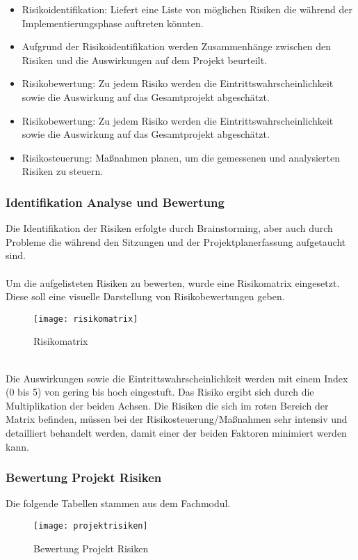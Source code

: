 \begin{itemize}
	\item Risikoidentifikation: Liefert eine Liste von möglichen Risiken die während der Implementierungsphase auftreten könnten. 
	\item Aufgrund der Risikoidentifikation werden Zusammenhänge zwischen den Risiken und die Auswirkungen auf dem Projekt beurteilt. 
	\item Risikobewertung: Zu jedem Risiko werden die Eintrittswahrscheinlichkeit sowie die Auswirkung auf das Gesamtprojekt abgeschätzt.
	\item Risikobewertung: Zu jedem Risiko werden die Eintrittswahrscheinlichkeit sowie die Auswirkung auf das Gesamtprojekt abgeschätzt.
	\item Risikosteuerung: Maßnahmen planen, um die gemessenen und analysierten Risiken zu steuern.
\end{itemize}

\subsubsection{Identifikation Analyse und Bewertung}
Die Identifikation der Risiken erfolgte durch Brainstorming, aber auch durch Probleme die während den Sitzungen und der Projektplanerfassung aufgetaucht sind.
\\
\\
Um die aufgelisteten Risiken zu bewerten, wurde eine Risikomatrix eingesetzt. Diese soll eine visuelle Darstellung von Risikobewertungen geben. 
\begin{figure}[htb!]
	\begin{center}
		\texttt{[image: risikomatrix]}
		\caption[Risikomatrix]{Risikomatrix}
		\label{fig:risikomatrix}
	\end{center}
\end{figure}
\\
Die Auswirkungen sowie die Eintrittswahrscheinlichkeit werden mit einem Index (0 bis 5) von gering bis hoch eingestuft. Das Risiko ergibt sich durch die Multiplikation der beiden Achsen. Die Risiken die sich im roten Bereich der Matrix befinden, müssen bei der Risikosteuerung/Maßnahmen sehr intensiv und detailliert behandelt werden, damit einer der beiden Faktoren minimiert werden kann. 
\\
\subsubsection{Bewertung Projekt Risiken}
Die folgende Tabellen stammen aus dem Fachmodul.
\begin{figure}[htb!]
	\begin{center}
		\texttt{[image: projektrisiken]}
		\caption[Bewertung Projekt Risiken]{Bewertung Projekt Risiken}
		\label{fig:projektrisiken}
	\end{center}
\end{figure}
